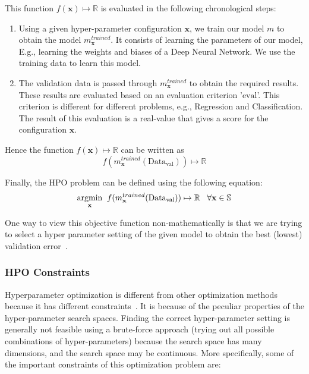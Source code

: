 \documentclass[12pt, twoside, ngerman]{report}
\begin{document}
This function $f(\textbf{x}) \mapsto \mathbb{R}$ is evaluated in the following chronological steps:
\begin{enumerate}
\item Using a given hyper-parameter configuration $\textbf{x}$,  we train our model $m$ to obtain the model $m^{trained}_\textbf{x}$. It consists of learning the parameters of our model, E.g., learning the weights and biases of a Deep Neural Network.
We use the training data to learn this model.
\item The validation data is passed through $m^{trained}_\textbf{x}$ to obtain the required results.
These results are evaluated based on an evaluation criterion '$\textrm{eval}$'. This criterion is different for different problems, e.g., Regression and Classification.
The result of this evaluation is a real-value that gives a score for the configuration $\textbf{x}$.
\end{enumerate}

Hence the function $f(\textbf{x}) \mapsto \mathbb{R}$ can be written as 
$$
f(m^{trained}_\textbf{x} (\textrm{Data}_\textrm{val})) \mapsto \mathbb{R}
$$

Finally, the HPO problem can be defined using the following equation:
\begin{equation}\label{eq:hpoobjectivefunc}
\underset{\rm \textbf{x}}{\rm argmin} \;\; f(m^{trained}_\textbf{x} (\textrm{Data}_\textrm{val})) \mapsto \mathbb{R}   \;\;\;  \forall \textbf{x} \in \mathbb{S}
\end{equation}

One way to view this objective function non-mathematically is that we are trying to select a hyper parameter setting of the given model to obtain the best (lowest) validation error~\cite{fsbopaper}.

\subsubsection{HPO Constraints}\label{sec:hpoConstraints}

Hyperparameter optimization is different from other optimization methods because it has different constraints~\cite{bayesianOptimizationTutorial}.
It is because of the peculiar properties of the hyper-parameter search spaces.
Finding the correct hyper-parameter setting is generally not feasible using a brute-force approach (trying out all possible combinations of hyper-parameters) because the search space has many dimensions, and the search space may be continuous.
More specifically,  some of the important constraints of this optimization problem are:
\end{document}
